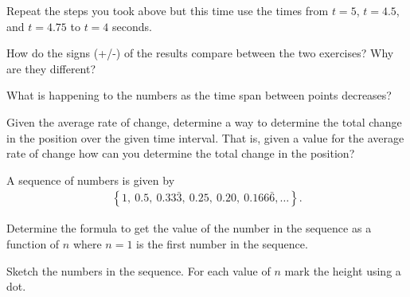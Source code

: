 \begin{problem}
\begin{subproblem}
      \vfill

    \item Repeat the steps you took above but this time use the times
      from $t=5$, $t=4.5$, and $t=4.75$ to $t=4$ seconds.

      \scalebox{0.5}{}
    
      \vfill

    \item How do the signs (+/-) of the results compare between the
      two exercises? Why are they different?  

      \vspace{4em}
    
    \item What is happening to the numbers as the time span between
      points decreases?

      \vspace{4em}

    \item Given the average rate of change, determine a way to
      determine the total change in the position over the given time
      interval. That is, given a value for the average rate of change
      how can you determine the total change in the position?

      \vfill

    \end{subproblem}

    \clearpage

  \item A sequence of numbers is given by
    \begin{eqnarray*}
      \left\{ 1,~0.5,~0.33\bar{3},~0.25,~0.20,~0.166\bar{6}, \ldots \right\}.
    \end{eqnarray*}

    \begin{subproblem}
    \item Determine the formula to get the value of the number in the
      sequence as a function of $n$ where $n=1$ is the first number in
      the sequence.

      \vfill

    \item Sketch the numbers in the sequence. For each value of $n$
      mark the height using a dot.

      \scalebox{0.8}{}

    \end{subproblem}



\end{problem}
